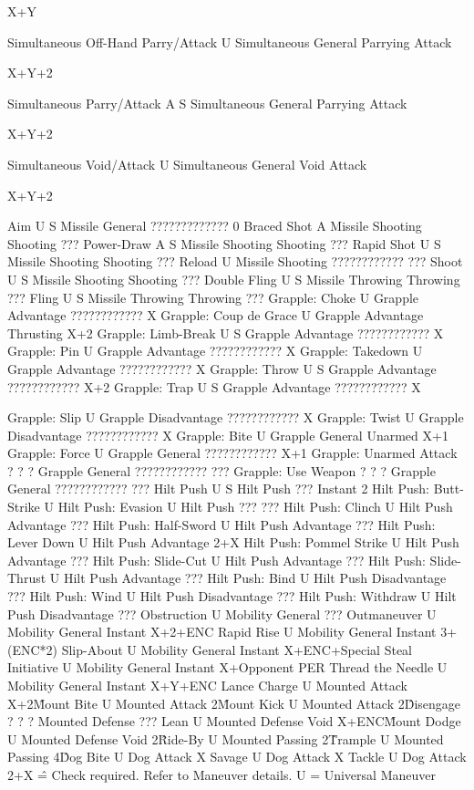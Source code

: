 \documentclass[oneside,11pt,english]{book}
\begin{document}
X+Y 

Simultaneous Off-Hand Parry/Attack U Simultaneous General Parrying 
Attack 

X+Y+2 

Simultaneous Parry/Attack A S Simultaneous General Parrying 
Attack 

X+Y+2 

Simultaneous Void/Attack U Simultaneous General Void 
Attack 

X+Y+2 

Aim U S Missile General ????????????? 0 
Braced Shot A Missile Shooting Shooting ??? 
Power-Draw A S Missile Shooting Shooting ??? 
Rapid Shot U S Missile Shooting Shooting ??? 
Reload U Missile Shooting ???????????? ??? 
Shoot U S Missile Shooting Shooting ??? 
Double Fling U S Missile Throwing Throwing ??? 
Fling U S Missile Throwing Throwing ??? 
Grapple: Choke U Grapple Advantage ???????????? X 
Grapple: Coup de Grace U Grapple Advantage Thrusting X+2 
Grapple: Limb-Break U S Grapple Advantage ???????????? X 
Grapple: Pin U Grapple Advantage ???????????? X 
Grapple: Takedown U Grapple Advantage ???????????? X 
Grapple: Throw U S Grapple Advantage ???????????? X+2 
Grapple: Trap U S Grapple Advantage ???????????? X 


Grapple: Slip U Grapple Disadvantage ???????????? X 
Grapple: Twist U Grapple Disadvantage ???????????? X 
Grapple: Bite U Grapple General Unarmed X+1 
Grapple: Force U Grapple General ???????????? X+1 
Grapple: Unarmed Attack ? ? ? Grapple General ???????????? ??? 
Grapple: Use Weapon ? ? ? Grapple General ???????????? ??? 
Hilt Push U S Hilt Push ??? Instant 2 
Hilt Push: Butt-Strike U 
Hilt Push: Evasion U Hilt Push ??? ??? 
Hilt Push: Clinch U Hilt Push Advantage ??? 
Hilt Push: Half-Sword U Hilt Push Advantage ??? 
Hilt Push: Lever Down U Hilt Push Advantage 2+X 
Hilt Push: Pommel Strike U Hilt Push Advantage ??? 
Hilt Push: Slide-Cut U Hilt Push Advantage ??? 
Hilt Push: Slide-Thrust U Hilt Push Advantage ??? 
Hilt Push: Bind U Hilt Push Disadvantage ??? 
Hilt Push: Wind U Hilt Push Disadvantage ??? 
Hilt Push: Withdraw U Hilt Push Disadvantage ??? 
Obstruction U Mobility General ??? 
Outmaneuver U Mobility General Instant X+2+ENC 
Rapid Rise U Mobility General Instant 3+(ENC*2) 
Slip-About U Mobility General Instant X+ENC+Special 
Steal Initiative U Mobility General Instant X+Opponent PER 
Thread the Needle U Mobility General Instant X+Y+ENC 
Lance Charge U Mounted Attack X+2\^ 
Mount Bite U Mounted Attack 2\^ 
Mount Kick U Mounted Attack 2\^ 
Disengage ? ? ? Mounted Defense ??? 
Lean U Mounted Defense Void X+ENC\^ 
Mount Dodge U Mounted Defense Void 2\^ 
Ride-By U Mounted Passing 2\^ 
Trample U Mounted Passing 4\^ 
Dog Bite U Dog Attack X 
Savage U Dog Attack X 
Tackle U Dog Attack 2+X 
\^ = Check required. Refer to Maneuver details. 
U = Universal Maneuver 
\end{document}
